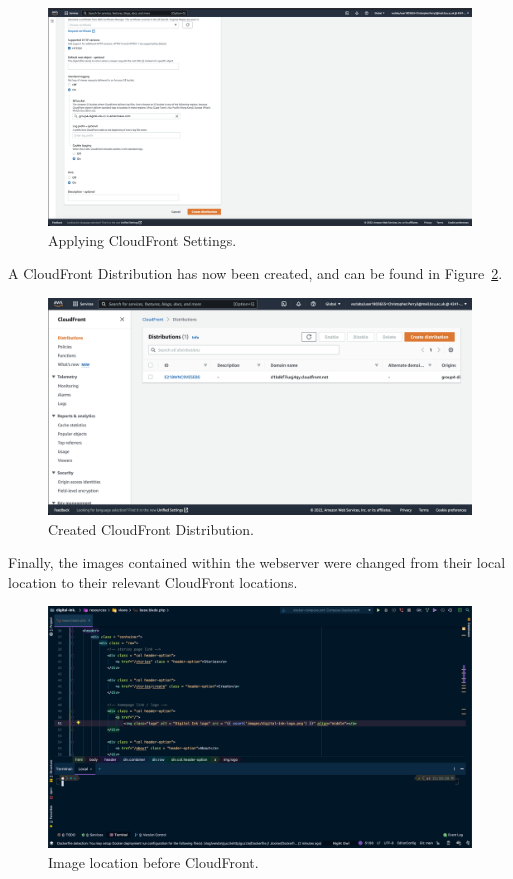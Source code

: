 \begin{figure}[!htbp]
    \centering
    \includegraphics[width=\textwidth]{resources/cloudfront/cloudfront-settings-2}
    \caption{Applying CloudFront Settings.}
    \label{fig:cloudfront-setting-2}
\end{figure}

A CloudFront Distribution has now been created, and can be found in Figure~\ref{fig:cloudfront-created}.

\begin{figure}[!htbp]
    \centering
    \includegraphics[width=\textwidth]{resources/cloudfront/cloudfront-created}
    \caption{Created CloudFront Distribution.}
    \label{fig:cloudfront-created}
\end{figure}

Finally, the images contained within the webserver were changed from their local location to their relevant CloudFront
locations.

\begin{figure}[!htbp]
    \centering
    \includegraphics[width=\textwidth]{resources/cloudfront/cloudfront-before}
    \caption{Image location before CloudFront.}
    \label{fig:cloudfront-before}
\end{figure}


